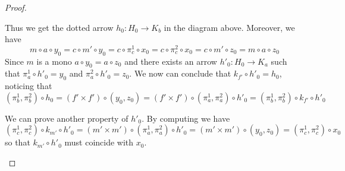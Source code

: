 \documentclass[3p]{elsarticle}
\theoremstyle{remark}
\theoremstyle{definition}
\begin{document}
\begin{proof}
\begin{enumerate}
 Thus we get the dotted arrow $h_0\colon H_0\to K_b$ in the diagram above. Moreover, we have
 \[m\circ a\circ y_0=c\circ m'\circ y_0=c\circ \pi^1_c\circ x_0=c\circ \pi^2_c\circ x_0=c\circ m'\circ z_0=m\circ a \circ z_0\]
 Since $m$ is a mono $a\circ y_0=a\circ z_0$ and there exists an arrow $h'_0\colon H_0\to K_a$ such that $\pi^1_a\circ h'_0=y_0$ and $\pi^2_a\circ h'_0=z_0$. 
 We now can conclude that $k_{f'}\circ h'_0=h_0$, noticing that
 \[(\pi^1_b, \pi^2_b)\circ h_0=(f'\times f')\circ (y_0, z_0)=(f'\times f')\circ (\pi^1_a, \pi^2_a)\circ h'_0=(\pi^1_b, \pi^2_b)\circ k_{f'}\circ h'_0\]

We can prove another property of $h'_0$. By computing we have
\[(\pi^1_c, \pi^2_c)\circ k_{m'}\circ h'_0=(m'\times m')\circ (\pi^1_a, \pi^2_a)\circ h'_0=(m'\times m')\circ (y_0, z_0)=(\pi^1_c, \pi^2_c)\circ x_0\]
so that $k_{m'}\circ h'_0$ must coincide with $x_0$.


\end{enumerate}
\end{proof}
\end{document}
